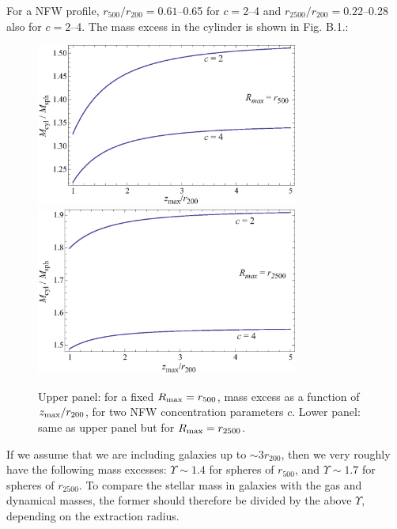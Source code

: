 \documentclass{aa}
\begin{document}
\begin{appendix}
For a NFW profile, $r_{500}/r_{200} = 0.61$--0.65 for $c=2$--4 and  
$r_{2500}/r_{200} = 0.22$--0.28 also for $c=2$--4. The mass excess in the cylinder is shown in Fig. B.1.:

\begin{figure}[htb]
\includegraphics*[width=8.6cm]{GeorCorrR500.eps}
\includegraphics*[width=8.6cm]{GeorCorrR2500.eps}
\caption[]{Upper panel: for a fixed $R_{\rm max} = r_{500}$, mass excess as a function 
of $z_{\rm max}/r_{200}$,  for two NFW
  concentration parameters $c$. Lower panel: same as upper panel but for $R_{\rm
    max} = r_{2500}$.}
\end{figure}


If we assume that we are including galaxies up to $\sim 3 r_{200}$, 
then we very roughly  have the following mass excesses: $\Upsilon \sim 1.4$ 
for spheres of $r_{500}$, and $\Upsilon \sim 1.7$ for spheres of $r_{2500}$.  
To compare the stellar mass in galaxies with the gas and 
dynamical masses, the former should therefore be divided by the above $\Upsilon$, depending on the 
extraction radius.


\end{appendix}
\end{document}
